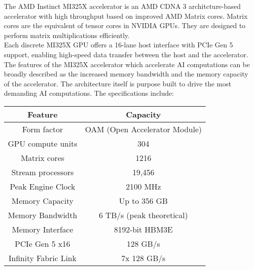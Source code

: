 \documentclass[12pt]{article}
\begin{document}
The AMD Instinct MI325X accelerator is an AMD CDNA 3 architcture-based accelerator with high throughput based on improved AMD Matrix cores. Matrix cores are the equivalent of tensor cores in NVIDIA GPUs. They are designed to perform matrix multiplications efficiently.\\
Each discrete MI325X GPU offers a 16-lane host interface with PCIe Gen 5 support, enabling high-speed data transfer between the host and the accelerator.\\
The features of the MI325X accelerator which accelerate AI computations can be broadly described as the increased memory bandwidth and the memory capacity of the accelerator. The architecture itself is purpose built to drive the most demanding AI computations. The specifications include:\\
\begin{tabular}{c|c}
    \hline
    Feature & Capacity\\
    \hline
    Form factor & OAM (Open Accelerator Module)\\
    GPU compute units & 304\\
    Matrix cores & 1216\\
    Stream processors & 19,456\\
    Peak Engine Clock & 2100 MHz\\
    Memory Capacity & Up to 356 GB\\
    Memory Bandwidth & 6 TB/s (peak theoretical)\\
    Memory Interface & 8192-bit HBM3E\\
    PCIe Gen 5 x16 & 128 GB/s\\
    Infinity Fabric Link & 7x 128 GB/s\\
    \hline
\end{tabular}\\
\end{document}
